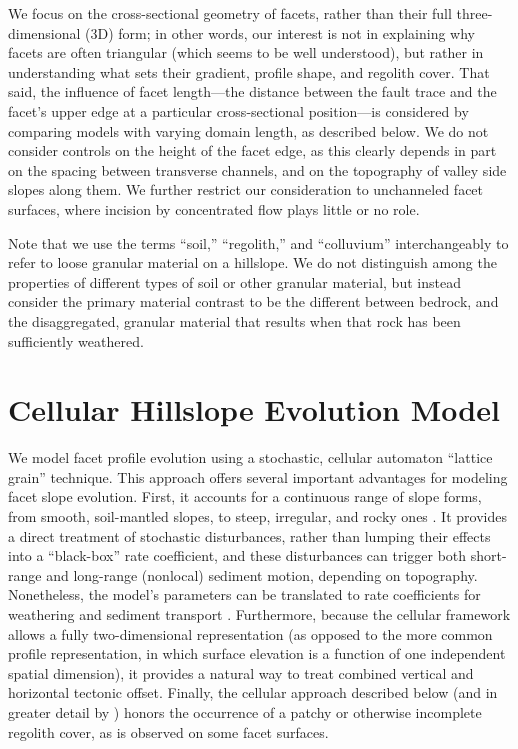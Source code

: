 We focus on the cross-sectional geometry of facets, rather than their full three-dimensional (3D) form; in other words, our interest is not in explaining why facets are often triangular (which seems to be well understood), but rather in understanding what sets their gradient, profile shape, and regolith cover. That said, the influence of facet length---the distance between the fault trace and the facet's upper edge at a particular cross-sectional position---is considered by comparing models with varying domain length, as described below. We do not consider controls on the height of the facet edge, as this clearly depends in part on the spacing between transverse channels, and on the topography of valley side slopes along them. We further restrict our consideration to unchanneled facet surfaces, where incision by concentrated flow plays little or no role.

Note that we use the terms ``soil,'' ``regolith,'' and ``colluvium'' interchangeably to refer to loose granular material on a hillslope. We do not distinguish among the properties of different types of soil or other granular material, but instead consider the primary material contrast to be the different between bedrock, and the disaggregated, granular material that results when that rock has been sufficiently weathered.


\section{Cellular Hillslope Evolution Model}

We model facet profile evolution using a stochastic, cellular automaton ``lattice grain'' technique. This approach offers several important advantages for modeling facet slope evolution. First, it accounts for a continuous range of slope forms, from smooth, soil-mantled slopes, to steep, irregular, and rocky ones \citep{tucker2018lattice}. It provides a direct treatment of stochastic disturbances, rather than lumping their effects into a ``black-box'' rate coefficient, and these disturbances can trigger both short-range and long-range (nonlocal) sediment motion, depending on topography. Nonetheless, the model's parameters can be translated to rate coefficients for weathering and sediment transport \citep{tucker2018lattice}. Furthermore, because the cellular framework allows a fully two-dimensional representation (as opposed to the more common profile representation, in which surface elevation is a function of one independent spatial dimension), it provides a natural way to treat combined vertical and horizontal tectonic offset. Finally, the cellular approach described below (and in greater detail by \citet{tucker2016celllab,tucker2018lattice}) honors the occurrence of a patchy or otherwise incomplete regolith cover, as is observed on some facet surfaces.

